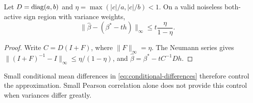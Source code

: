 \begin{proposition}
 \label{prop:bound}
 Let $D = \operatorname{diag}(a,b)$ and $\eta = \max(|c|/a,|c|/b) < 1$. On a valid noiseless
 both-active sign region with variance weights,
 \[
  \|\hat\beta - (\beta^* - th)\|_\infty \le t\frac{\eta}{1 - \eta}.
 \]
\end{proposition}
\begin{proof}
 Write $C = D(I + F)$, where $\|F\|_\infty = \eta$. The Neumann series gives
 $\|(I + F)^{-1} - I\|_\infty \le \eta/(1 - \eta)$, and
 $\hat\beta = \beta^* - tC^{-1}Dh$.
\end{proof}
Small conditional mean differences in \eqref{eq:conditional-differences}
therefore control the approximation. Small Pearson correlation alone does not
provide this control when variances differ greatly.
